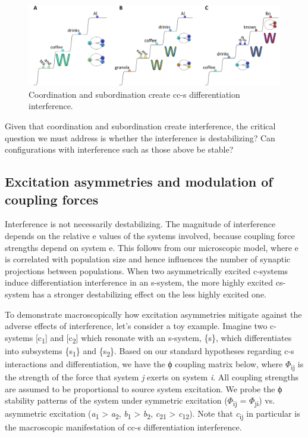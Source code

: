   
\begin{figure}
\includegraphics[width=\textwidth]{figures/Tilsen-img94.png}
\caption{Coordination and subordination create cc-s differentiation interference.}
\label{fig:4:44}
\end{figure}
 

  Given that coordination and subordination create interference, the critical question we must address is whether the interference is destabilizing? Can configurations with interference such as those above be stable? 

\subsection{Excitation asymmetries and modulation of coupling forces}

Interference is not necessarily destabilizing. The magnitude of interference depends on the relative e values of the systems involved, because coupling force strengths depend on system e. This follows from our microscopic model, where e is correlated with population size and hence influences the number of synaptic projections between populations. When two asymmetrically excited c-systems induce differentiation interference in an s-system, the more highly excited cs-system has a stronger destabilizing effect on the less highly excited one.

  To demonstrate macroscopically how excitation asymmetries mitigate against the adverse effects of interference, let's consider a toy example. Imagine two c-systems [c\textsubscript{1}] and [c\textsubscript{2}] which resonate with an s-system, \{s\}, which differentiates into subsystems \{s\textsubscript{1}\} and \{s\textsubscript{2}\}. Based on our standard hypotheses regarding c-s interactions and differentiation, we have the ϕ coupling matrix below, where $\Phi$\textsubscript{ij} is the strength of the force that system \textit{j} exerts on system \textit{i}. All coupling strengths are assumed to be proportional to source system excitation. We probe the ϕ stability patterns of the system under symmetric excitation ($\Phi$\textsubscript{ij} = $\Phi$\textsubscript{ji}) vs. asymmetric excitation (\textit{a}\textsubscript{1} > \textit{a}\textsubscript{2}, \textit{b}\textsubscript{1} > \textit{b}\textsubscript{2}, \textit{c}\textsubscript{21} > \textit{c}\textsubscript{12}). Note that \textit{c}\textsubscript{ij} in particular is the macroscopic manifestation of cc-s differentiation interference.

